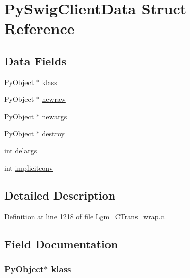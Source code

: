 \hypertarget{struct_py_swig_client_data}{
\section{PySwigClientData Struct Reference}
\label{struct_py_swig_client_data}
}
\subsection*{Data Fields}
\begin{CompactItemize}
\item 
PyObject $\ast$ \hyperlink{struct_py_swig_client_data_74cf66d18e3e059f7dcc41a53729e84c}{klass}
\item 
PyObject $\ast$ \hyperlink{struct_py_swig_client_data_c343cdc04c579bb3d46e9be516791975}{newraw}
\item 
PyObject $\ast$ \hyperlink{struct_py_swig_client_data_3f965a13b63b1a28ab3880b8852f89d0}{newargs}
\item 
PyObject $\ast$ \hyperlink{struct_py_swig_client_data_16b3d2144ed476f6f20f3897a874c430}{destroy}
\item 
int \hyperlink{struct_py_swig_client_data_cb70a26b5c3b873ee8492f96d6f04722}{delargs}
\item 
int \hyperlink{struct_py_swig_client_data_efc03bc0f3c3a18125653ab9f5c5486e}{implicitconv}
\end{CompactItemize}


\subsection{Detailed Description}


Definition at line 1218 of file Lgm\_\-CTrans\_\-wrap.c.

\subsection{Field Documentation}
\hypertarget{struct_py_swig_client_data_74cf66d18e3e059f7dcc41a53729e84c}{
\subsubsection[{klass}]{\setlength{\rightskip}{0pt plus 5cm}PyObject$\ast$ {\bf klass}}}
\label{struct_py_swig_client_data_74cf66d18e3e059f7dcc41a53729e84c}




